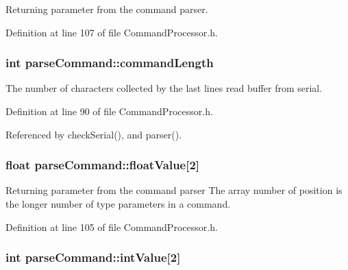 Returning parameter from the command parser. 



Definition at line 107 of file Command\-Processor.\-h.

\hypertarget{structparse_command_a8359e121af4d2f16e054ead0b7844a30}{
\subsubsection[{command\-Length}]{\setlength{\rightskip}{0pt plus 5cm}int parse\-Command\-::command\-Length}}\label{structparse_command_a8359e121af4d2f16e054ead0b7844a30}


The number of characters collected by the last lines read buffer from serial. 



Definition at line 90 of file Command\-Processor.\-h.



Referenced by check\-Serial(), and parser().

\hypertarget{structparse_command_a475f06e9e3728cc583008ad66dc48329}{
\subsubsection[{float\-Value}]{\setlength{\rightskip}{0pt plus 5cm}float parse\-Command\-::float\-Value\mbox{[}2\mbox{]}}}\label{structparse_command_a475f06e9e3728cc583008ad66dc48329}


Returning parameter from the command parser The array number of position is the longer number of type parameters in a command. 



Definition at line 105 of file Command\-Processor.\-h.

\hypertarget{structparse_command_a9ad775810b79683631510fd333096c6f}{
\subsubsection[{int\-Value}]{\setlength{\rightskip}{0pt plus 5cm}int parse\-Command\-::int\-Value\mbox{[}2\mbox{]}}}\label{structparse_command_a9ad775810b79683631510fd333096c6f}


